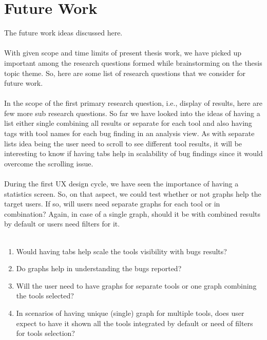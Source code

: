 \chapter{Future Work}
\label{ch:futurework_report}

The future work ideas discussed here. \\ \\

With given scope and time limits of present thesis work, we have picked up important among the research questions formed while brainstorming on the thesis topic theme. So, here are some list of research questions that we consider for future work. \\ \\

In the scope of the first primary research question, i.e., display of results, here are few more sub research questions. So far we have looked into the ideas of having a list either single combining all results or separate for each tool and also having tags with tool names for each bug finding in an analysis view. As with separate lists idea being the user need to scroll to see different tool results, it will be interesting to know if having tabs help in scalability of bug findings since it would overcome the scrolling issue. \\ \\

During the first UX design cycle, we have seen the importance of having a statistics screen. So, on that aspect, we could test whether or not graphs help the target users. If so, will users need separate graphs for each tool or in combination? Again, in case of a single graph, should it be with combined results by default or users need filters for it. \\ \\

\begin{enumerate}
\item Would having tabs help scale the tools visibility with bugs results?
\item Do graphs help in understanding the bugs reported?
\item Will the user need to have graphs for separate tools or one graph combining the tools selected?
\item In scenarios of having unique (single) graph for multiple tools, does user expect to have it shown all the tools integrated by default or need of filters for tools selection? \\ \\
\end{enumerate} 

